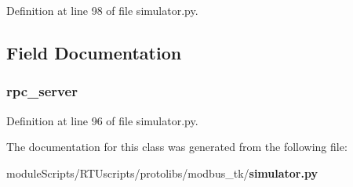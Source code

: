 Definition at line 98 of file simulator.\+py.



\subsection{Field Documentation}
\subsubsection[{rpc\+\_\+server}]{\setlength{\rightskip}{0pt plus 5cm}rpc\+\_\+server}\label{classprotolibs_1_1modbus__tk_1_1simulator_1_1_rpc_interface_abc206e2eea8564043b64058b06e5b079}


Definition at line 96 of file simulator.\+py.



The documentation for this class was generated from the following file\+:\begin{DoxyCompactItemize}
\item 
module\+Scripts/\+R\+T\+Uscripts/protolibs/modbus\+\_\+tk/{\bf simulator.\+py}\end{DoxyCompactItemize}
